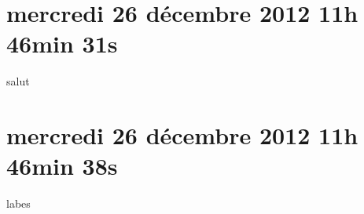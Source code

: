 
\section{mercredi 26 décembre 2012 11h 46min 31s}

salut

\section{mercredi 26 décembre 2012 11h 46min 38s}

labes
